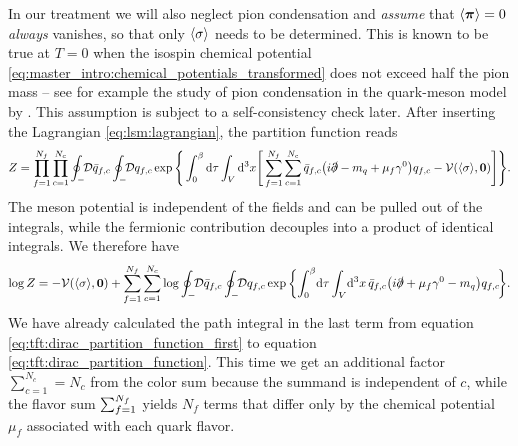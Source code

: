 In our treatment we will also neglect pion condensation and \emph{assume} that $\langle {\bm{\pi}} \rangle=0$ \emph{always} vanishes,
so that only $\langle \sigma \rangle$ needs to be determined.
This is known to be true at $T=0$ when the isospin chemical potential \eqref{eq:master_intro:chemical_potentials_transformed} does not exceed half the pion mass
-- see for example the study of pion condensation in the quark-meson model by \cite{ref:jo_lsm_consistent,ref:jo_lsm_pion_condensation}.
This assumption is subject to a self-consistency check later.
After inserting the Lagrangian \eqref{eq:lsm:lagrangian}, the partition function reads
\begin{equation}
	Z = \prod_{f=1}^{\smash{N_f}} \prod_{c=1}^{\smash{N_c}} \oint_- \!\! \mathcal{D} \bar{q}_{f,c} \oint_- \!\! \mathcal{D} q_{f,c} \exp \Bigg\{ \int_0^{\beta} \mathop{}\!\mathrm{d} \tau \int_V \mathop{}\!\mathrm{d}^3 x \Bigg[ \sum_{f=1}^{\smash{N_f}} \sum_{c=1}^{N_c} \bar{q}_{f,c} \big( i \slashed\partial - m_q + \mu_f \gamma^0 \big) q_{f,c} - \mathcal{V}(\langle \sigma \rangle,{\bm{0}}) \Bigg] \Bigg\}.
\end{equation}
The meson potential is independent of the fields and can be pulled out of the integrals,
while the fermionic contribution decouples into a product of identical integrals.
We therefore have
\begin{equation}
\begin{split}
	\log Z = -\pot(\avg{\sigma},\vec{0}) + \sum_{f=1}^{\smash{N_f}} \sum_{c=1}^{N_c} \log \oint_- \!\! \pathintdif \bar{q}_{f,c} \oint_- \!\! \pathintdif q_{f,c} \exp \bigg\{ \! \int_0^\beta \! \dif \tau \int_V \! \dif^3 x \, \bar{q}_{f,c} \big(i \slashed\partial + \mu_f \gamma^0 - m_q\big) q_{f,c} \! \bigg\} .
\end{split}
\end{equation}
We have already calculated the path integral in the last term
from equation \eqref{eq:tft:dirac_partition_function_first} to equation \eqref{eq:tft:dirac_partition_function}.
This time we get an additional factor $\sum_{c=1}^{N_c} = N_c$ from the color sum because the summand is independent of $c$,
while the flavor sum $\sum_{f=1}^{\smash{N_f}}$ yields $N_f$ terms that differ only by the chemical potential $\mu_f$ associated with each quark flavor. 
